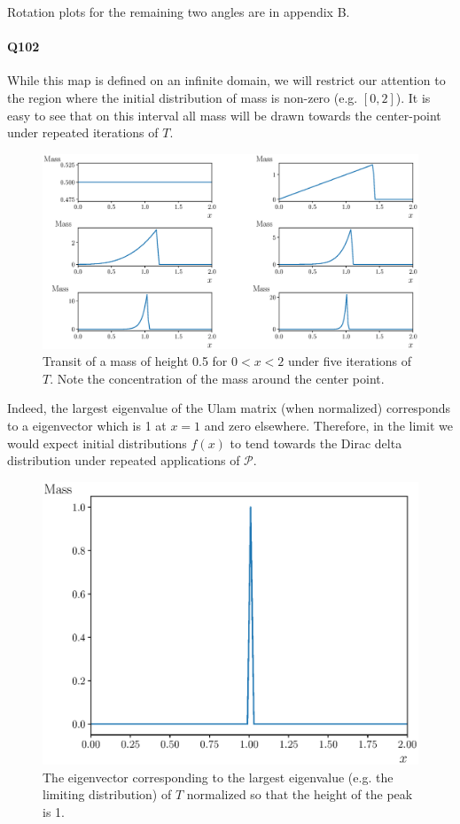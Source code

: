 \documentclass{article}
\begin{document}
Rotation plots for the remaining two angles are in appendix B.

\paragraph{Q102}
While this map is defined on an infinite domain, we will restrict our attention to the region where 
the initial distribution of mass is non-zero (e.g. $[0,2]$). It is easy to see that on this 
interval all mass will be drawn towards the center-point under repeated iterations of $T$.

\begin{figure}[H]
	\centering
	\includegraphics[scale = 0.55]{Q107_102_Mass_Trans.eps}
	\caption{Transit of a mass of height 0.5 for $0 < x < 2$ under five iterations of $T$. Note 
	the concentration of the mass around the center point.}
\end{figure}

Indeed, the largest eigenvalue of the Ulam matrix (when normalized) corresponds to a eigenvector 
which is 1 at $x = 1$ and zero elsewhere. 
Therefore, in the limit we would expect initial distributions $f(x)$ to tend towards the 
Dirac delta distribution under repeated applications of $\mathcal{P}$.

\begin{figure}[H]
	\centering
	\includegraphics[scale = 0.55]{Q107_102_Mass_Ets.eps}
	\caption{The eigenvector corresponding to the largest eigenvalue (e.g. the limiting distribution) of $T$ normalized so that the height of 
	the peak is 1.}
\end{figure}
\end{document}
